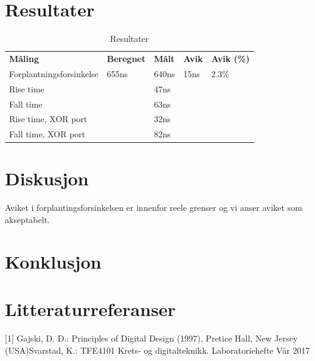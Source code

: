 \documentclass{article}
\begin{document}
\section{Resultater}
\begin{table}[h]
	\centering
	\caption{Resultater}
	\label{my-label}
	\begin{tabular}{lllll}
	\textbf{Måling}          & \textbf{Beregnet} & \textbf{Målt} & \textbf{Avik} & \textbf{Avik (\%)} \\
	Forplantningsforsinkelse & 655ns             & 640ns         & 15ns          & 2.3\%              \\
	Rise time                &                   & 47ns          &               &                    \\
	Fall time                &                   & 63ns          &               &                    \\
	Rise time, XOR port      &                   & 32ns          &               &                    \\
	Fall time, XOR port      &                   & 82ns          &               &
	\end{tabular}
\end{table}

\newpage
\section{Diskusjon}
Aviket i forplantingsforsinkelsen er innenfor reele grenser og vi anser aviket som akseptabelt. 
\section{Konklusjon}



\section{Litteraturreferanser}
[1] Gajski, D. D.: Principles of Digital Design (1997), Pretice Hall, New Jersey (USA)\newline
[2] Svarstad, K.: TFE4101 Krets- og digitalteknikk. Laboratoriehefte Vår 2017
\end{document}

